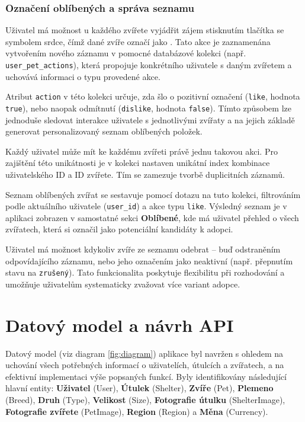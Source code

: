 \documentclass[czech, bp, kiv, he, iso690numb, pdf]{fasthesis}
\begin{document}
    \subsubsection*{Označení oblíbených a správa seznamu}

    Uživatel má možnost u každého zvířete vyjádřit zájem stisknutím tlačítka se symbolem srdce, čímž dané zvíře označí jako . Tato akce je zaznamenána vytvořením nového záznamu v pomocné databázové kolekci (např. \texttt{user\_pet\_actions}), která propojuje konkrétního uživatele s daným zvířetem a uchovává informaci o typu provedené akce.

    Atribut \texttt{action} v této kolekci určuje, zda šlo o pozitivní označení (\texttt{like}, hodnota \texttt{true}), nebo naopak odmítnutí (\texttt{dislike}, hodnota \texttt{false}). Tímto způsobem lze jednoduše sledovat interakce uživatele s jednotlivými zvířaty a na jejich základě generovat personalizovaný seznam oblíbených položek.


    Každý uživatel může mít ke každému zvířeti právě jednu takovou akci. Pro zajištění této unikátnosti je v kolekci nastaven unikátní index kombinace uživatelského ID a ID zvířete. Tím se zamezuje tvorbě duplicitních záznamů.

    Seznam oblíbených zvířat se sestavuje pomocí dotazu na tuto kolekci, filtrováním podle aktuálního uživatele (\texttt{user\_id}) a akce typu \texttt{like}. Výsledný seznam je v aplikaci zobrazen v samostatné sekci \textbf{Oblíbené}, kde má uživatel přehled o všech zvířatech, která si označil jako potenciální kandidáty k adopci.

    Uživatel má možnost kdykoliv zvíře ze seznamu odebrat – buď odstraněním odpovídajícího záznamu, nebo jeho označením jako neaktivní (např. přepnutím stavu na \texttt{zrušený}). Tato funkcionalita poskytuje flexibilitu při rozhodování a umožňuje uživatelům systematicky zvažovat více variant adopce.



    \section{Datový model a návrh API}
    \label{sec:datovy_model}

    Datový model (viz diagram \ref{fig:diagram}) aplikace byl navržen s ohledem na uchování všech potřebných informací o uživatelích, útulcích a zvířatech, a na efektivní implementaci výše popsaných funkcí. Byly identifikovány následující hlavní entity: \textbf{Uživatel} (User), \textbf{Útulek} (Shelter), \textbf{Zvíře} (Pet), \textbf{Plemeno} (Breed), \textbf{Druh} (Type), \textbf{Velikost} (Size), \textbf{Fotografie útulku} (ShelterImage), \textbf{Fotografie zvířete} (PetImage), \textbf{Region} (Region) a \textbf{Měna} (Currency).
\end{document}
